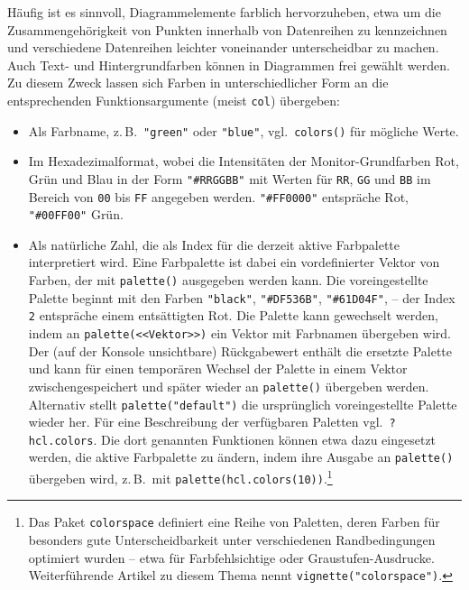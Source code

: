 Häufig ist es sinnvoll, Diagrammelemente farblich hervorzuheben, etwa um die Zusammengehörigkeit von Punkten innerhalb von Datenreihen zu kennzeichnen und verschiedene Datenreihen leichter voneinander unterscheidbar zu machen. Auch Text- und Hintergrundfarben können in Diagrammen frei gewählt werden. Zu diesem Zweck lassen sich Farben in unterschiedlicher Form an die entsprechenden Funktionsargumente (meist \lstinline!col!) übergeben:

\begin{itemize}
\item Als Farbname, z.\,B.\ \lstinline!"green"! oder \lstinline!"blue"!, vgl.\ \lstinline!colors()! für mögliche Werte.
\item Im Hexadezimalformat, wobei die Intensitäten der Monitor-Grundfarben Rot, Grün und Blau in der Form \lstinline!"#RRGGBB"! mit Werten für \lstinline!RR!, \lstinline!GG! und \lstinline!BB! im Bereich von \lstinline!00! bis \lstinline!FF! angegeben werden. \lstinline!"#FF0000"! entspräche Rot, \lstinline!"#00FF00"! Grün.
\item Als natürliche Zahl, die als Index für die derzeit aktive Farbpalette interpretiert wird. Eine Farbpalette ist dabei ein vordefinierter Vektor von Farben, der mit \lstinline!palette()! ausgegeben werden kann. Die voreingestellte Palette beginnt mit den Farben \lstinline!"black"!, \lstinline!"#DF536B"!, \lstinline!"#61D04F"!, -- der Index \lstinline!2! entspräche einem entsättigten Rot. Die Palette kann gewechselt werden, indem an \lstinline!palette(<<Vektor>>)! ein Vektor mit Farbnamen übergeben wird. Der (auf der Konsole unsichtbare) Rückgabewert enthält die ersetzte Palette und kann für einen temporären Wechsel der Palette in einem Vektor zwischengespeichert und später wieder an \lstinline!palette()! übergeben werden. Alternativ stellt \lstinline!palette("default")! die ursprünglich voreingestellte Palette wieder her. Für eine Beschreibung der verfügbaren Paletten vgl.\ \lstinline!?hcl.colors!. Die dort genannten Funktionen können etwa dazu eingesetzt werden, die aktive Farbpalette zu ändern, indem ihre Ausgabe an \lstinline!palette()! übergeben wird, z.\,B.\ mit \lstinline!palette(hcl.colors(10))!.\footnote{Das Paket  \lstinline!colorspace! \cite{Zeileis2019, Ihaka2009} definiert eine Reihe von Paletten, deren Farben für besonders gute Unterscheidbarkeit unter verschiedenen Randbedingungen optimiert wurden -- etwa für Farbfehlsichtige oder Graustufen-Ausdrucke. Weiterführende Artikel zu diesem Thema nennt \lstinline!vignette("colorspace")!.}
\end{itemize}

